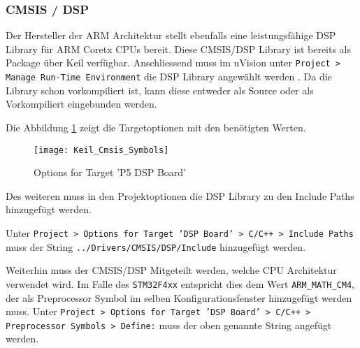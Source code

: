 \subsubsection{CMSIS / DSP}
\label{sec:CMSISDSP}

Der Hersteller der ARM Architektur stellt ebenfalls eine leistungsfähige DSP Library für ARM Coretx CPUs bereit.
Diese CMSIS/DSP Library ist bereits als Package über Keil verfügbar.
Anschliessend muss im uVision unter \texttt{Project > Manage Run-Time Environment} die DSP Library angewählt werden \cite{enable-cmsis-dsp-lib}.
Da die Library schon vorkompiliert ist, kann diese entweder als Source oder als Vorkompiliert eingebunden werden.

Die Abbildung \ref{pic:Keil_Cmsis_Symbols} zeigt die Targetoptionen mit den benötigten Werten.

\begin{figure}[H]
	\centering
	\texttt{[image: Keil\_Cmsis\_Symbols]}
	\caption{Options for Target 'P5 DSP Board'}
	\label{pic:Keil_Cmsis_Symbols}
\end{figure}

Des weiteren muss in den Projektoptionen die DSP Library zu den Include Paths hinzugefügt werden.

Unter \texttt{Project > Options for Target 'DSP Board' > C/C++ > Include Paths} muss der String \texttt{../Drivers/CMSIS/DSP/Include} hinzugefügt werden.

Weiterhin muss der CMSIS/DSP Mitgeteilt werden, welche CPU Architektur verwendet wird. Im Falle des \texttt{STM32F4xx} entspricht dies dem Wert \texttt{ARM\_MATH\_CM4}, der als Preprocessor Symbol im selben Konfigurationsfenster hinzugefügt werden muss.
Unter \texttt{Project > Options for Target 'DSP Board' > C/C++ > Preprocessor Symbols > Define:} muss der oben genannte String angefügt werden.






